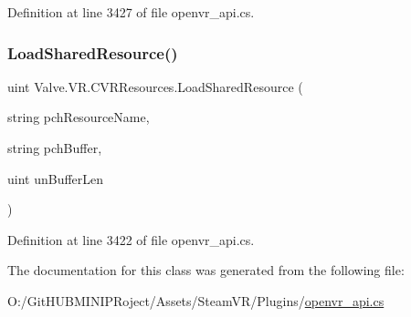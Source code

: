 Definition at line 3427 of file openvr\+\_\+api.\+cs.

\mbox{\label{class_valve_1_1_v_r_1_1_c_v_r_resources_abaf157d3efd7e7e055d5f9d6cfd8dec0}} 
\subsubsection{\texorpdfstring{LoadSharedResource()}{LoadSharedResource()}}
{\footnotesize\ttfamily uint Valve.\+V\+R.\+C\+V\+R\+Resources.\+Load\+Shared\+Resource (\begin{DoxyParamCaption}\item[{string}]{pch\+Resource\+Name,  }\item[{string}]{pch\+Buffer,  }\item[{uint}]{un\+Buffer\+Len }\end{DoxyParamCaption})}



Definition at line 3422 of file openvr\+\_\+api.\+cs.



The documentation for this class was generated from the following file\+:\begin{DoxyCompactItemize}
\item 
O\+:/\+Git\+H\+U\+B\+M\+I\+N\+I\+P\+Roject/\+Assets/\+Steam\+V\+R/\+Plugins/\mbox{\hyperlink{openvr__api_8cs}{openvr\+\_\+api.\+cs}}\end{DoxyCompactItemize}
